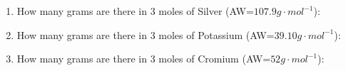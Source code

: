 \documentclass[main.tex]{subfiles}
\begin{document}
\begin{multicols*}{2}
\begin{enumerate}
\item How many grams are there in 3 moles of Silver (AW=$107.9g\cdot mol^{-1}$):
\begin{enumerate}[label=(\alph*)]
\end{enumerate}

\item How many grams are there in 3 moles of Potassium (AW=$39.10g\cdot mol^{-1}$):
\begin{enumerate}[label=(\alph*)]
\end{enumerate}

\item How many grams are there in 3 moles of Cromium (AW=$52g\cdot mol^{-1}$):
\begin{enumerate}[label=(\alph*)]
\end{enumerate}


\end{enumerate}
\end{multicols*}
\end{document}
